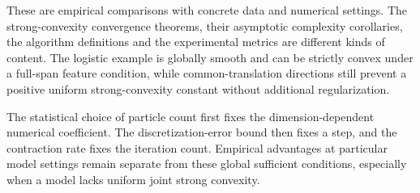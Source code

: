 \documentclass[11pt,a4paper]{article}
\begin{document}
These are empirical comparisons with concrete data and numerical settings.
The strong-convexity convergence theorems, their asymptotic complexity
corollaries, the algorithm definitions and the experimental metrics are
different kinds of content. The logistic example is globally smooth and can be strictly convex under a full-span feature condition, while common-translation directions still prevent a positive uniform strong-convexity constant without additional regularization.



The statistical choice of particle count first fixes the dimension-dependent numerical coefficient. The discretization-error bound then fixes a step, and the contraction rate fixes the iteration count. Empirical advantages at particular model settings remain separate from these global sufficient conditions, especially when a model lacks uniform joint strong convexity.
\end{document}
